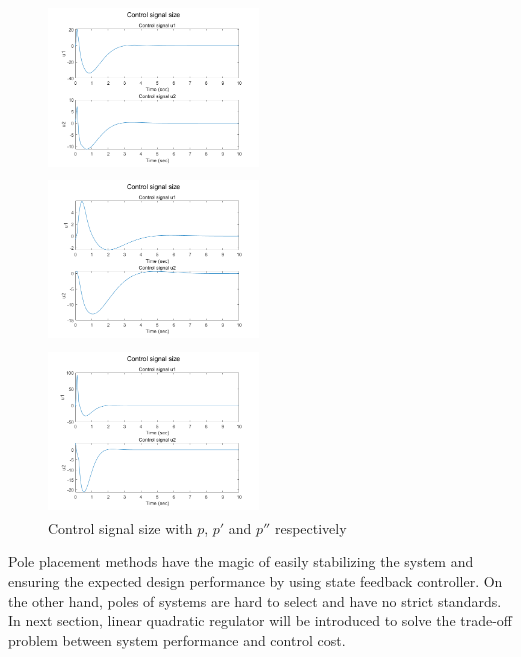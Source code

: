 \documentclass[hyperref]{article}
\theoremstyle{nonumberplain}
\begin{document}
	
	\begin{figure}[htbp] %
		\begin{minipage}[t]{0.33\linewidth} %
			\centering
			\includegraphics[width=2.2in, height=1.74in]{fig40.png} %
		\end{minipage}%
		\begin{minipage}[t]{0.33\linewidth}
			\centering
			\includegraphics[width=2.2in, height=1.74in]{fig42.png}
		\end{minipage}%
		\begin{minipage}[t]{0.33\linewidth}
			\centering
			\includegraphics[width=2.2in, height=1.74in]{fig44.png}
		\end{minipage}
		\caption{Control signal size with $p$, ${p}'$ and ${p}''$ respectively}
		\label{fig9}
	\end{figure}

	
	Pole placement methods have the magic of easily stabilizing the system and ensuring the expected design performance by using state feedback controller. On the other hand, poles of systems are hard to select and have no strict standards. In next section, linear quadratic regulator will be introduced to solve the trade-off problem between system performance and control cost.
	
\end{document}

